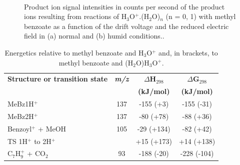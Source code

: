 \begin{figure}[htbp]
\centering
{}\\
\caption{Product ion signal intensities in counts per second of the product ions resulting from reactions of H$_3$O$^+$.(H$_2$O)$_n$ (n = 0, 1) with methyl benzoate as a function of the drift voltage and the reduced electric field in (a) normal and (b) humid conditions..}
\label{fig:MeBzEN}
\end{figure}

\begin{table}[htbp]
\centering
\caption{Energetics relative to methyl benzoate and H$_3$O$^+$ and, in brackets, to methyl benzoate and (H$_2$O)H$_3$O$^+$. }
\label{tb:mb2}
\begin{tabular}{lccc}
\toprule
\textbf{Structure or transition state}	&\textbf{\textit{m/z} } &\textbf{$\Delta$H$_{298}$} &\textbf{$\Delta$G$_{298}$}\\
& &	\textbf{(kJ/mol)} &\textbf{(kJ/mol)} \\  \toprule
MeBz1H$^+$   					&	137	& -155 (+3)  & -155 (-31)   \\ \midrule
MeBz2H$^+$ 						&	137	& -80 (+78)  & -88 (+36)    \\ \midrule
Benzoyl$^+$ + MeOH				&	105	& -29 (+134)  & -82 (+42)   \\ \midrule
TS 1H$^+$ to 2H$^+$                     &		& +15 (+173)  	& +14 (+138)\\ \midrule
C$_7$H$_9^+$ + CO$_2$           &   93  &   -188 (-20) & -228 (-104) \\
\bottomrule
\end{tabular}
\end{table}


